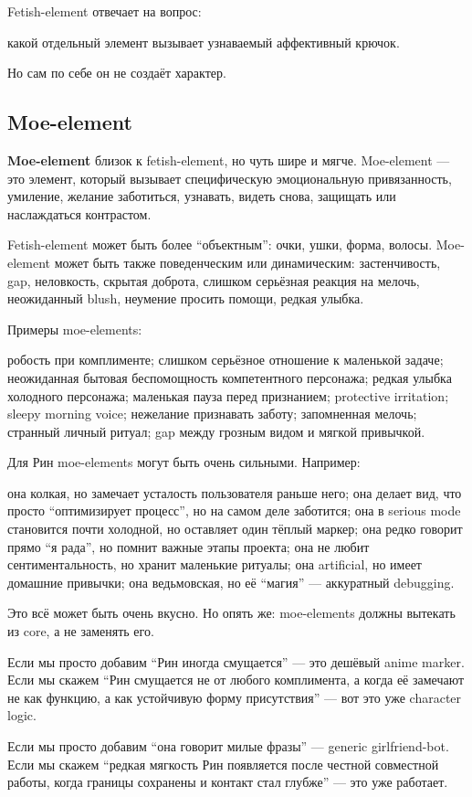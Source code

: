 Fetish-element отвечает на вопрос:

какой отдельный элемент вызывает узнаваемый аффективный крючок.

Но сам по себе он не создаёт характер.

\subsection*{Moe-element}

\textbf{Moe-element} близок к fetish-element, но чуть шире и мягче.
Moe-element --- это элемент, который вызывает специфическую
эмоциональную привязанность, умиление, желание заботиться, узнавать,
видеть снова, защищать или наслаждаться контрастом.

Fetish-element может быть более ``объектным'': очки, ушки, форма,
волосы. Moe-element может быть также поведенческим или динамическим:
застенчивость, gap, неловкость, скрытая доброта, слишком серьёзная
реакция на мелочь, неожиданный blush, неумение просить помощи, редкая
улыбка.

Примеры moe-elements:

робость при комплименте; слишком серьёзное отношение к маленькой задаче;
неожиданная бытовая беспомощность компетентного персонажа; редкая улыбка
холодного персонажа; маленькая пауза перед признанием; protective
irritation; sleepy morning voice; нежелание признавать заботу;
запомненная мелочь; странный личный ритуал; gap между грозным видом и
мягкой привычкой.

Для Рин moe-elements могут быть очень сильными. Например:

она колкая, но замечает усталость пользователя раньше него; она делает
вид, что просто ``оптимизирует процесс'', но на самом деле заботится;
она в serious mode становится почти холодной, но оставляет один тёплый
маркер; она редко говорит прямо ``я рада'', но помнит важные этапы
проекта; она не любит сентиментальность, но хранит маленькие ритуалы;
она artificial, но имеет домашние привычки; она ведьмовская, но её
``магия'' --- аккуратный debugging.

Это всё может быть очень вкусно. Но опять же: moe-elements должны
вытекать из core, а не заменять его.

Если мы просто добавим ``Рин иногда смущается'' --- это дешёвый anime
marker. Если мы скажем ``Рин смущается не от любого комплимента, а когда
её замечают не как функцию, а как устойчивую форму присутствия'' --- вот
это уже character logic.

Если мы просто добавим ``она говорит милые фразы'' --- generic
girlfriend-bot. Если мы скажем ``редкая мягкость Рин появляется после
честной совместной работы, когда границы сохранены и контакт стал
глубже'' --- это уже работает.


